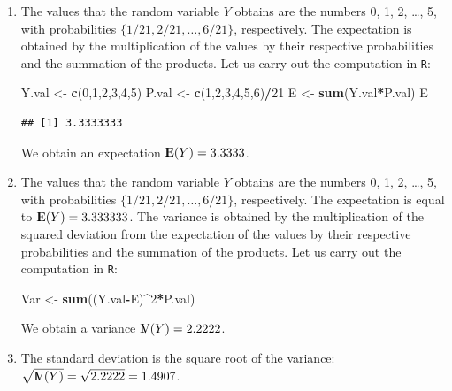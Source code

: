 \documentclass[]{krantz}
\makeatletter
\newenvironment{Shaded}{\begin{snugshade}}{\end{snugshade}}
\newcommand{\DecValTok}[1]{\textcolor[rgb]{0.00,0.00,0.81}{#1}}
\newcommand{\KeywordTok}[1]{\textcolor[rgb]{0.13,0.29,0.53}{\textbf{#1}}}
\newcommand{\NormalTok}[1]{#1}
\newcommand{\OperatorTok}[1]{\textcolor[rgb]{0.81,0.36,0.00}{\textbf{#1}}}
\newcommand{\StringTok}[1]{\textcolor[rgb]{0.31,0.60,0.02}{#1}}
\newcommand{\Expec}{{\rm I\kern-.3em E}}
\newcommand{\Var}{{\rm I\kern-.3em V}}
\newenvironment{kframe}{%
\medskip{}
\setlength{\fboxsep}{.8em}
 \def\at@end@of@kframe{}%
 \ifinner\ifhmode%
  \def\at@end@of@kframe{\end{minipage}}%
  \begin{minipage}{\columnwidth}%
 \fi\fi%
 \def\FrameCommand##1{\hskip\@totalleftmargin \hskip-\fboxsep
 \colorbox{shadecolor}{##1}\hskip-\fboxsep
     \hskip-\linewidth \hskip-\@totalleftmargin \hskip\columnwidth}%
 \MakeFramed {\advance\hsize-\width
   \@totalleftmargin\z@ \linewidth\hsize
   \@setminipage}}%
 {\par\unskip\endMakeFramed%
 \at@end@of@kframe}
\renewenvironment{Shaded}{\begin{kframe}}{\end{kframe}}
\theoremstyle{definition}
\theoremstyle{definition}
\theoremstyle{definition}
\theoremstyle{remark}
\makeatother
\begin{document}
\begin{enumerate}
\def\labelenumi{\arabic{enumi}.}
\setcounter{enumi}{5}
\item
  The values that the random
  variable \(Y\) obtains are the numbers 0, 1, 2, \ldots{}, 5, with probabilities
  \(\{1/21, 2/21, \ldots, 6/21\}\), respectively. The expectation is
  obtained by the multiplication of the values by their respective
  probabilities and the summation of the products. Let us carry out the
  computation in \texttt{R}:

\begin{Shaded}
\begin{Highlighting}[]
\NormalTok{Y.val <-}\StringTok{ }\KeywordTok{c}\NormalTok{(}\DecValTok{0}\NormalTok{,}\DecValTok{1}\NormalTok{,}\DecValTok{2}\NormalTok{,}\DecValTok{3}\NormalTok{,}\DecValTok{4}\NormalTok{,}\DecValTok{5}\NormalTok{)}
\NormalTok{P.val <-}\StringTok{ }\KeywordTok{c}\NormalTok{(}\DecValTok{1}\NormalTok{,}\DecValTok{2}\NormalTok{,}\DecValTok{3}\NormalTok{,}\DecValTok{4}\NormalTok{,}\DecValTok{5}\NormalTok{,}\DecValTok{6}\NormalTok{)}\OperatorTok{/}\DecValTok{21}
\NormalTok{E <-}\StringTok{ }\KeywordTok{sum}\NormalTok{(Y.val}\OperatorTok{*}\NormalTok{P.val)}
\NormalTok{E}
\end{Highlighting}
\end{Shaded}

\begin{verbatim}
## [1] 3.3333333
\end{verbatim}

  We obtain an expectation \(\Expec(Y) = 3.3333\).
\item
  The values that the random
  variable \(Y\) obtains are the numbers 0, 1, 2, \ldots{}, 5, with probabilities
  \(\{1/21, 2/21, \ldots, 6/21\}\), respectively. The expectation is equal
  to \(\Expec(Y) = 3.333333\). The variance is obtained by the
  multiplication of the squared deviation from the expectation of the
  values by their respective probabilities and the summation of the
  products. Let us carry out the computation in \texttt{R}:

\begin{Shaded}
\begin{Highlighting}[]
\NormalTok{Var <-}\StringTok{ }\KeywordTok{sum}\NormalTok{((Y.val}\OperatorTok{-}\NormalTok{E)}\OperatorTok{^}\DecValTok{2}\OperatorTok{*}\NormalTok{P.val)}
\end{Highlighting}
\end{Shaded}

  We obtain a variance \(\Var(Y) = 2.2222\).
\item
  The standard deviation is the
  square root of the variance: \(\sqrt{\Var(Y)} = \sqrt{2.2222} = 1.4907\).
\end{enumerate}
\end{document}
